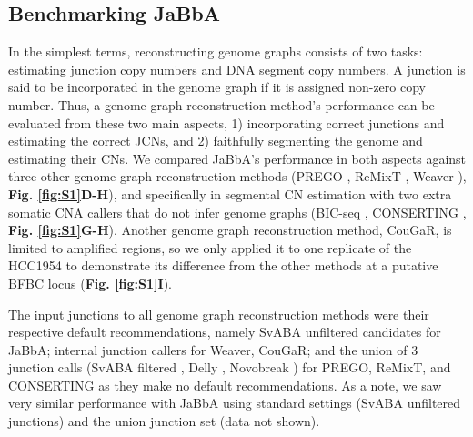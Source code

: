 \documentclass[phd,tocprelim]{cornell}
\begin{document}
\subsection*{Benchmarking JaBbA}
In the simplest terms, reconstructing genome graphs consists of two tasks: estimating junction copy numbers and DNA segment copy numbers. A junction is said to be incorporated in the genome graph if it is assigned non-zero copy number. Thus, a genome graph reconstruction method's performance can be evaluated from these two main aspects, 1) incorporating correct junctions and estimating the correct JCNs, and 2) faithfully segmenting the genome and estimating their CNs. We compared JaBbA's performance in both aspects against three other genome graph reconstruction methods (PREGO \cite{Oesper2012-vw}, ReMixT \cite{McPherson2017-ry}, Weaver \cite{Li2016-qa}), \textbf{Fig. \ref{fig:S1}D-H}), and specifically in segmental CN estimation with two extra somatic CNA callers that do not infer genome graphs (BIC-seq \cite{Xi2011-oa}, CONSERTING \cite{Chen2015-sw}, \textbf{Fig. \ref{fig:S1}G-H}). Another genome graph reconstruction method, CouGaR, is limited to amplified regions, so we only applied it to one replicate of the HCC1954 to demonstrate its difference from the other methods at a putative BFBC locus (\textbf{Fig. \ref{fig:S1}I}).

The input junctions to all genome graph reconstruction methods were their respective default recommendations, namely SvABA unfiltered candidates for JaBbA; internal junction callers for Weaver, CouGaR; and the union of 3 junction calls (SvABA filtered \cite{wala2018}, Delly \cite{Rausch2012-ly}, Novobreak \cite{Chong2017-gl}) for PREGO, ReMixT, and CONSERTING as they make no default recommendations.  As a note, we saw very similar performance with JaBbA using standard settings (SvABA unfiltered junctions) and the union junction set (data not shown). 

\end{document}
